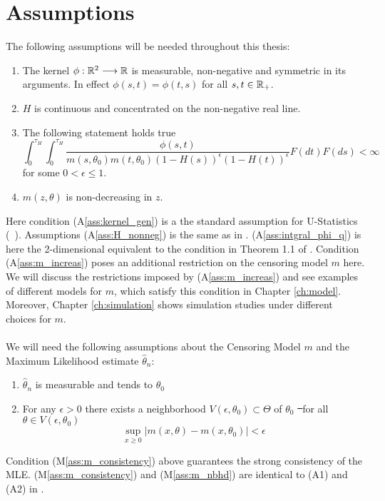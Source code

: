 \section{Assumptions}
The following assumptions will be needed throughout this thesis:
\begin{enumerate}[({A}1)]
	\item \label{ass:kernel_gen} The kernel $\phi: \mathbb{R}^2 \longrightarrow \mathbb{R}$ is measurable, non-negative and symmetric in its arguments. In effect $\phi(s,t) = \phi(t,s)$ for all $s,t \in \mathbb{R}_+$. 
	\item \label{ass:H_nonneg} $H$ is continuous and concentrated on the non-negative real line.
	\item \label{ass:intgral_phi_q} The following statement holds true
	$$\int_{0}^{\tau_H} \int_{0}^{\tau_H} \frac{\phi(s,t)}{m(s, \theta_0)m(t,\theta_0)(1-H(s))^\epsilon(1-H(t))^{\epsilon}} F(dt)F(ds) < \infty$$
	for some $0<\epsilon\leq 1$.
	\item $m(z,\theta)$ is non-decreasing in $z$. \label{ass:m_increas}
\end{enumerate}
Here condition (A\ref{ass:kernel_gen}) is a the standard assumption for U-Statistics (\cf\ \cite{lee1990u}). Assumptions (A\ref{ass:H_nonneg}) is the same as in \cite{dikta2000strong}. (A\ref{ass:intgral_phi_q}) is here the 2-dimensional equivalent to the condition in Theorem 1.1 of \cite{dikta2000strong}. Condition (A\ref{ass:m_increas}) poses an additional restriction on the censoring model $m$ here. We will discuss the restrictions imposed by (A\ref{ass:m_increas}) and see examples of different models for $m$, which satisfy this condition in Chapter \ref{ch:model}. Moreover, Chapter \ref{ch:simulation} shows simulation studies under different choices for $m$.\\
\\
%
%
We will need the following assumptions about the Censoring Model $m$ and the Maximum Likelihood estimate $\hat\theta_n$:
\begin{enumerate}[({M}1)]
	\item \label{ass:m_consistency} $\hat{\theta}_n$ is measurable and tends to $\theta_0$
	\item \label{ass:m_nbhd} For any $\epsilon>0$ there exists a neighborhood $V(\epsilon, \theta_0)\subset \Theta$ of $\theta_0$ \st\ for all $\theta\in V(\epsilon, \theta_0)$ 
	$$\sup\limits_{x\geq 0} |m(x, \theta) - m(x, \theta_0)| < \epsilon$$
\end{enumerate}
Condition (M\ref{ass:m_consistency}) above guarantees the strong consistency of the MLE. (M\ref{ass:m_consistency}) and (M\ref{ass:m_nbhd}) are identical to (A1) and (A2) in \cite{dikta2000strong}.
